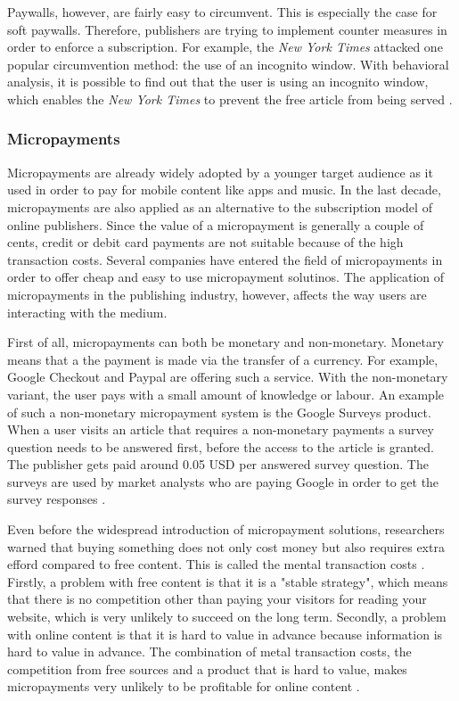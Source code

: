 
Paywalls, however, are fairly easy to circumvent. This is especially the case for soft paywalls. Therefore, publishers are trying to implement counter measures in order to enforce a subscription. For example, the \textit{New York Times} attacked one popular circumvention method: the use of an incognito window. With behavioral analysis, it is possible to find out that the user is using an incognito window, which enables the \textit{New York Times} to prevent the free article from being served \cite{troupson2015yes}.  

\subsubsection{Micropayments}
Micropayments are already widely adopted by a younger target audience as it used in order to pay for mobile content like apps and music. In the last decade, micropayments are also applied as an alternative to the subscription model of online publishers. Since the value of a micropayment is generally a couple of cents, credit or debit card payments are not suitable because of the high transaction costs. Several companies have entered the field of micropayments in order to offer cheap and easy to use micropayment solutinos. The application of micropayments in the publishing industry, however, affects the way users are interacting with the medium. 

First of all, micropayments can both be monetary and non-monetary. Monetary means that a the payment is made via the transfer of a currency. For example, Google Checkout and Paypal are offering such a service. With the non-monetary variant, the user pays with a small amount of knowledge or labour. An example of such a non-monetary micropayment system is the Google Surveys product. When a user visits an article that requires a non-monetary payments a survey question needs to be answered first, before the access to the article is granted. The publisher gets paid around 0.05 USD per answered survey question. The surveys are used by market analysts who are paying Google in order to get the survey responses \cite{googlesurveys}.

Even before the widespread introduction of micropayment solutions, researchers warned that buying something does not only cost money but also requires extra efford compared to free content. This is called the mental transaction costs \cite{szabo, shirky}. Firstly, a problem with free content is that it is a "stable strategy", which means that there is no competition other than paying your visitors for reading your website, which is very unlikely to succeed on the long term. Secondly, a problem with online content is that it is hard to value in advance because information is hard to value in advance. The combination of metal transaction costs, the competition from free sources and a product that is hard to value, makes micropayments very unlikely to be profitable for online content \cite{shirky}.






